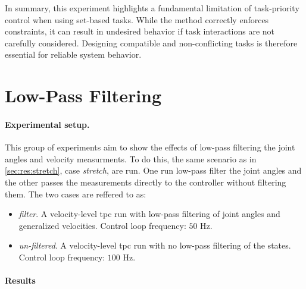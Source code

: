 In summary, this experiment highlights a fundamental limitation of task-priority control when using set-based tasks. While the method correctly enforces constraints, it can result in undesired behavior if task interactions are not carefully considered. Designing compatible and non-conflicting tasks is therefore essential for reliable system behavior.

\FloatBarrier


\newpage
\section{Low-Pass Filtering}
\label{sec:results:lowpass_filtering}
\label{sec:results:lowpass}

\paragraph{Experimental setup.}
This group of experiments aim to show the effects of low-pass filtering the
joint angles and velocity measurments. To do this, the same scenario as in \autoref{sec:res:stretch}, case \textit{stretch},
are run. One run low-pass filter the joint angles and the other passes the measurements
directly to the controller without filtering them. The two cases are reffered to as:
\begin{itemize}
    \item \textit{filter}. A velocity-level \gls{tpc} run with low-pass filtering of joint angles and generalized velocities.
        Control loop frequency: \(50\) Hz.
    \item \textit{un-filtered}. A velocity-level \gls{tpc} run with no low-pass filtering of the states.
        Control loop frequency: \(100\) Hz.
\end{itemize}

\paragraph{Results}

